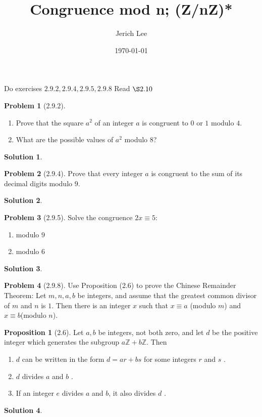 \documentclass[12pt]{article}
\title{Congruence mod n; (Z/nZ)*}
\author{Jerich Lee}
\date{\today}
\theoremstyle{definition} %
\newtheorem{solution}{Solution}
\newtheorem{proposition}{Proposition}
\newtheorem{problem}{Problem}
\theoremstyle{plain} %
\begin{document}
\maketitle
Do exercises $2.9.2, 2.9.4, 2.9.5, 2.9.8$
Read $\S 2.10$  
\begin{problem}[2.9.2]
   \noindent
   \begin{enumerate}
    \item Prove that the square $a^{2}$ of an integer $a$ is congruent to $0$ or $1$ modulo $4$.
    \item What are the possible values of $a^{2}$ modulo $8$?    
   \end{enumerate} 
\end{problem}
\begin{solution}
    
\end{solution}
\begin{problem}[2.9.4]
   Prove that every integer $a$ is congruent to the sum of its decimal digits modulo $9$.  
\end{problem}
\begin{solution}
    
\end{solution}
\begin{problem}[2.9.5]
   Solve the congruence $2x \equiv 5$:
   \noindent
   \begin{enumerate}
    \item modulo $9$
    \item modulo $6$  
   \end{enumerate}  
\end{problem}
\begin{solution}
    
\end{solution}
\begin{problem}[2.9.8]
   Use Proposition (2.6) to prove the Chinese Remainder Theorem: Let $m,n,a,b$ be integers, and assume that the greatest common divisor of $m$ and $n$ is $1$. Then there is an integer $x$ such that $x \equiv a$ (modulo $m$) and $x \equiv b$(modulo $n$).
   \begin{proposition}[2.6]
    Let $a,b$ be integers, not both zero, and let $d$ be the positive integer which generates the subgroup $a\mathbb{{Z}}+b\mathbb{{Z}}$. Then
    \noindent
    \begin{enumerate}
        \item $d$ can be written in the form $d=ar + bs$ for some integers $r$ and $s$ .
        \item $d$ divides $a$ and $b$ .
        \item If an integer $e$ divides $a$ and $b$, it also divides $d$ .
    \end{enumerate} 
   \end{proposition}     
\end{problem}
\begin{solution}
    
\end{solution}
\end{document}
